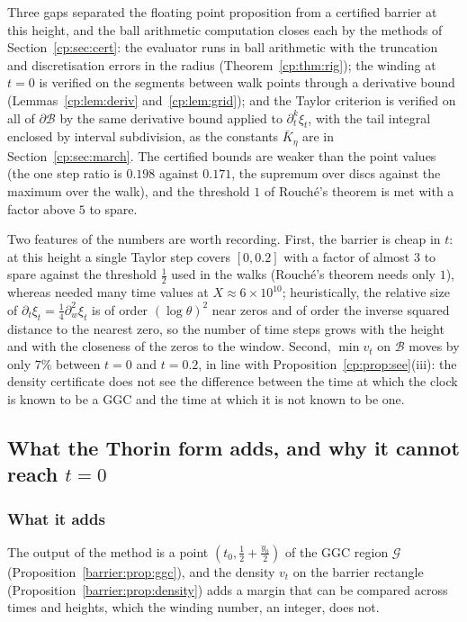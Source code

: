 Three gaps separated the floating point proposition from a certified barrier at this height, and the ball arithmetic computation closes each by the methods of Section~\ref{cp:sec:cert}: the evaluator runs in ball arithmetic with the truncation and discretisation errors in the radius (Theorem~\ref{cp:thm:rig}); the winding at $t=0$ is verified on the segments between walk points through a derivative bound (Lemmas~\ref{cp:lem:deriv} and~\ref{cp:lem:grid}); and the Taylor criterion is verified on all of $\partial\mathcal B$ by the same derivative bound applied to $\partial_t^k\xi_t$, with the tail integral enclosed by interval subdivision, as the constants $\bar K_\eta$ are in Section~\ref{cp:sec:march}. The certified bounds are weaker than the point values (the one step ratio is $0.198$ against $0.171$, the supremum over discs against the maximum over the walk), and the threshold $1$ of Rouch\'e's theorem is met with a factor above $5$ to spare.

Two features of the numbers are worth recording. First, the barrier is cheap in $t$: at this height a single Taylor step covers $[0,0.2]$ with a factor of almost $3$ to spare against the threshold $\frac12$ used in the walks (Rouch\'e's theorem needs only $1$), whereas \cite{Polymath} needed many time values at $X\approx6\times10^{10}$; heuristically, the relative size of $\partial_t\xi_t=\frac14\partial_w^2\xi_t$ is of order $(\log\theta)^2$ near zeros and of order the inverse squared distance to the nearest zero, so the number of time steps grows with the height and with the closeness of the zeros to the window. Second, $\min v_t$ on $\mathcal B$ moves by only $7\%$ between $t=0$ and $t=0.2$, in line with Proposition~\ref{cp:prop:see}(iii): the density certificate does not see the difference between the time at which the clock is known to be a GGC and the time at which it is not known to be one.

\subsection{What the Thorin form adds, and why it cannot reach \texorpdfstring{$t=0$}{t=0}}\label{barrier:sec:limits}

\subsubsection{What it adds}

The output of the method is a point $(t_0,\frac12+\frac{y_0}2)$ of the GGC region $\mathcal G$ (Proposition~\ref{barrier:prop:ggc}), and the density $v_t$ on the barrier rectangle (Proposition~\ref{barrier:prop:density}) adds a margin that can be compared across times and heights, which the winding number, an integer, does not.

